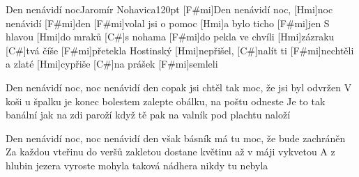 \begin{song}{Den nenávidí noc}{Jaromír Nohavica}{120pt}
%
[F#mi]Den nenávidí noc, [Hmi]noc nenávidí [F#mi]den
[F#mi]volal jsi o pomoc [Hmi]a bylo ticho [F#mi]jen
S hlavou [Hmi]do mraků [C#]s nohama [F#mi]do pekla
ve chvíli [Hmi]zázraku [C#]tvá číše [F#mi]přetekla
\rl Hostinský [Hmi]nepřišel, [C#]nalít ti [F#mi]nechtěli
a zlaté [Hmi]cypřiše [C#]na prášek [F#mi]semleli\rr{}

%
Den nenávidí noc, noc nenávidí den
copak jsi chtěl tak moc, že jsi byl odvržen
V koši u špalku je konec bolestem
zalepte obálku, na poštu odneste
\rl Je to tak banální jak na zdi paroží
když tě pak na valník pod plachtu naloží\rr{}

%
Den nenávidí noc, noc nenávidí den
však básník má tu moc, že bude zachráněn
Za každou vteřinu do veršů zakletou
dostane květinu až v máji vykvetou
\rl A z hlubin jezera vyroste mohyla
taková nádhera nikdy tu nebyla\rr{}
\end{song}

